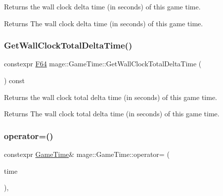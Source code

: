 Returns the wall clock delta time (in seconds) of this game time.

\begin{DoxyReturn}{Returns}
The wall clock delta time (in seconds) of this game time. 
\end{DoxyReturn}
\mbox{\label{classmage_1_1_game_time_a75c3675ead79cd32c9d77c70f3bd67ba}} 
\subsubsection{\texorpdfstring{Get\+Wall\+Clock\+Total\+Delta\+Time()}{GetWallClockTotalDeltaTime()}}
{\footnotesize\ttfamily constexpr \mbox{\hyperlink{namespacemage_ad26233bbec640deda836e572c1a23708}{F64}} mage\+::\+Game\+Time\+::\+Get\+Wall\+Clock\+Total\+Delta\+Time (\begin{DoxyParamCaption}{ }\end{DoxyParamCaption}) const\hspace{0.3cm}{\ttfamily [noexcept]}}

Returns the wall clock total delta time (in seconds) of this game time.

\begin{DoxyReturn}{Returns}
The wall clock total delta time (in seconds) of this game time. 
\end{DoxyReturn}
\mbox{\label{classmage_1_1_game_time_a7ebc520cb69228e457c24958e7b97baa}} 
\subsubsection{\texorpdfstring{operator=()}{operator=()}\hspace{0.1cm}{\footnotesize\ttfamily [1/2]}}
{\footnotesize\ttfamily constexpr \mbox{\hyperlink{classmage_1_1_game_time}{Game\+Time}}\& mage\+::\+Game\+Time\+::operator= (\begin{DoxyParamCaption}\item[{const \mbox{\hyperlink{classmage_1_1_game_time}{Game\+Time}} \&}]{time }\end{DoxyParamCaption})\hspace{0.3cm}{\ttfamily [default]}, {\ttfamily [noexcept]}}

